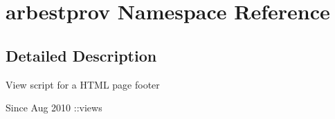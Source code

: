 \hypertarget{namespacearbestprov}{\section{arbestprov Namespace Reference}
\label{namespacearbestprov}
}


\subsection{Detailed Description}
View script for a H\-T\-M\-L page footer

\begin{DoxySince}{Since}
Aug 2010 \-::views 
\end{DoxySince}
